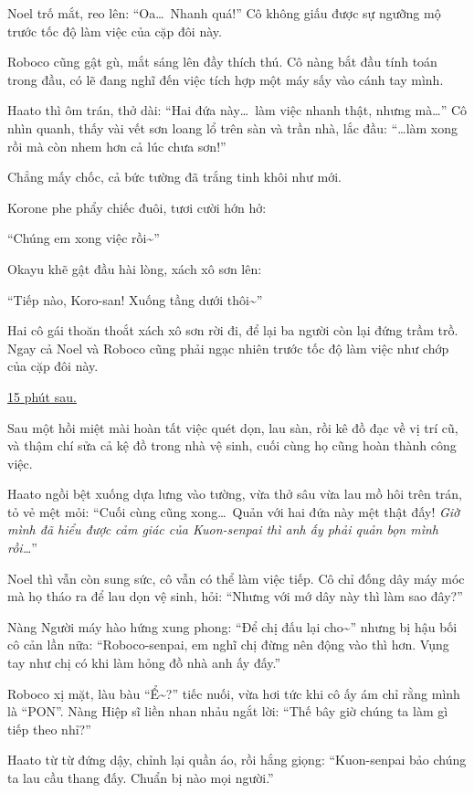 \documentclass[../main.tex]{subfiles}
\begin{document}
Noel trố mắt, reo lên: ``Oa\dots\ Nhanh quá!'' Cô không giấu được sự ngưỡng mộ trước tốc độ làm việc của cặp đôi này.

Roboco cũng gật gù, mắt sáng lên đầy thích thú. Cô nàng bắt đầu tính toán trong đầu, có lẽ đang nghĩ đến việc tích hợp một máy sấy vào cánh tay mình.

Haato thì ôm trán, thở dài: ``Hai đứa này\dots\ làm việc nhanh thật, nhưng mà\dots'' Cô nhìn quanh, thấy vài vết sơn loang lổ trên sàn và trần nhà, lắc đầu: ``\dots làm xong rồi mà còn nhem hơn cả lúc chưa sơn!''

Chẳng mấy chốc, cả bức tường đã trắng tinh khôi như mới.

Korone phe phẩy chiếc đuôi, tươi cười hớn hở:

``Chúng em xong việc rồi\~{}''

Okayu khẽ gật đầu hài lòng, xách xô sơn lên:

``Tiếp nào, Koro-san! Xuống tầng dưới thôi\~{}''

Hai cô gái thoăn thoắt xách xô sơn rời đi, để lại ba người còn lại đứng trầm trồ. Ngay cả Noel và Roboco cũng phải ngạc nhiên trước tốc độ làm việc như chớp của cặp đôi này.

\begin{center}
    \uline{15 phút sau.}
\end{center}

Sau một hồi miệt mài hoàn tất việc quét dọn, lau sàn, rồi kê đồ đạc về vị trí cũ, và thậm chí sửa cả kệ đồ trong nhà vệ sinh, cuối cùng họ cũng hoàn thành công việc.

Haato ngồi bệt xuống dựa lưng vào tường, vừa thở sâu vừa lau mồ hôi trên trán, tỏ vẻ mệt mỏi: ``Cuối cùng cũng xong\dots\ Quản với hai đứa này mệt thật đấy! \textit{Giờ mình đã hiểu được cảm giác của Kuon-senpai thì anh ấy phải quản bọn mình rồi\dots}''

Noel thì vẫn còn sung sức, cô vẫn có thể làm việc tiếp. Cô chỉ đống dây máy móc mà họ tháo ra để lau dọn vệ sinh, hỏi: ``Nhưng với mớ dây này thì làm sao đây?''

Nàng Người máy hào hứng xung phong: ``Để chị đấu lại cho\~{}'' nhưng bị hậu bối cô cản lần nữa: ``Roboco-senpai, em nghĩ chị đừng nên động vào thì hơn. Vụng tay như chị có khi làm hỏng đồ nhà anh ấy đấy.''

Roboco xị mặt, làu bàu ``Ể\~{}?'' tiếc nuối, vừa hơi tức khi cô ấy ám chỉ rằng mình là ``PON''. Nàng Hiệp sĩ liền nhan nhảu ngắt lời: ``Thế bây giờ chúng ta làm gì tiếp theo nhỉ?''

Haato từ từ đứng dậy, chỉnh lại quần áo, rồi hắng giọng: ``Kuon-senpai bảo chúng ta lau cầu thang đấy. Chuẩn bị nào mọi người.''
\end{document}
